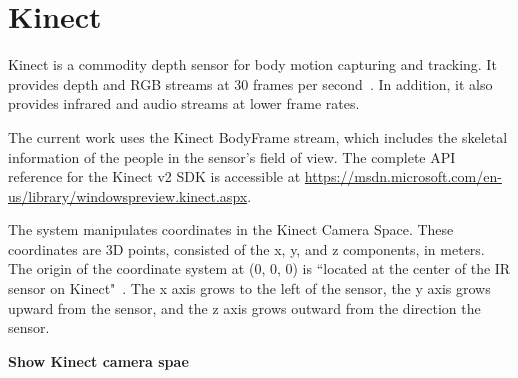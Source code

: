 \section{Kinect}
\label{sec:introduction_kinect}

Kinect is a commodity depth sensor for body motion capturing and tracking. It provides depth and RGB streams at 30 frames per second~\cite{kinect_sensor_specs}. In addition, it also provides infrared and audio streams at lower frame rates.

The current work uses the Kinect BodyFrame stream, which includes the skeletal information of the people in the sensor's field of view. The complete API reference for the Kinect v2 SDK is accessible at \url{https://msdn.microsoft.com/en-us/library/windowspreview.kinect.aspx}.

The system manipulates coordinates in the Kinect Camera Space. These coordinates are 3D points, consisted of the x, y, and z components, in meters. The origin of the coordinate system at (0, 0, 0) is ``located at the center of the IR sensor on Kinect"~\cite{microsoft_kinect_coordinates}. The x axis grows to the left of the sensor, the y axis grows upward from the sensor, and the z axis grows outward from the direction the sensor.

\textbf{Show Kinect camera spae}


